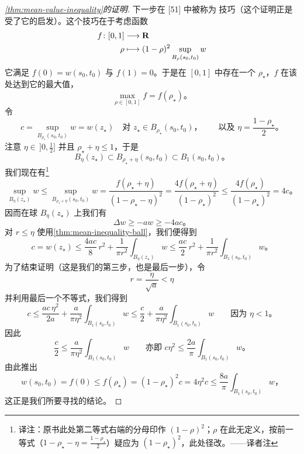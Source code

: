 \begin{proof}[\cref{thm:mean-value-inequality}的证明]
下一步在 [51] 中被称为 \emph{\trHeinz}技巧（这个证明正是受了它的启发）。这个技巧在于考虑函数
\[
\begin{aligned}
f\colon[0,1]&\longrightarrow\mathbf{R}\\
\rho&\longmapsto(1-\rho)^{2}\sup_{B_{\rho}(s_{0},t_{0})}w
\end{aligned}
\]
它满足 $f(0)=w(s_{0},t_{0})$ 与 $f(1)=0$。于是在 $[0,1]$ 中存在一个 $\rho_{\star}$，$f$ 在该处达到它的最大值，
\[
\max_{\rho\in[0,1]}f=f(\rho_{\star})\text{。}
\]
令
\[
c=\sup_{B_{\rho_{\star}}(s_{0},t_{0})}w=w(z_{\star})\quad\text{对 }z_{\star}\in B_{\rho_{\star}}(s_{0},t_{0})\text{，}\qquad\text{以及 }\eta=\frac{1-\rho_{\star}}{2}\text{。}
\]
注意 $\eta\in\,]0,\frac{1}{2}]$ 并且 $\rho_{\star}+\eta\le 1$，于是
\[
B_{\eta}(z_{\star})\subset B_{\rho_{\star}+\eta}(s_{0},t_{0})\subset B_{1}(s_{0},t_{0})\text{。}
\]
我们现在有\footnote{译注：原书此处第二等式右端的分母印作 $(1-\rho)^{2}$；$\rho$ 在此无定义，按前一等式（$1-\rho_{\star}-\eta=\frac{1-\rho_{\star}}{2}$）疑应为 $(1-\rho_{\star})^{2}$，此处径改。——译者注}
\[
\sup_{B_{\eta}(z_{\star})}w\le\sup_{B_{\rho_{\star}+\eta}(s_{0},t_{0})}w=\frac{f(\rho_{\star}+\eta)}{(1-\rho_{\star}-\eta)^{2}}=\frac{4f(\rho_{\star}+\eta)}{(1-\rho_{\star})^{2}}\le\frac{4f(\rho_{\star})}{(1-\rho_{\star})^{2}}=4c\text{。}
\]
因而在球 $B_{\eta}(z_{\star})$ 上我们有
\[
\Delta w\ge-aw\ge-4ac\text{。}
\]
对 $r\le\eta$ 使用\cref{thm:mean-inequality-ball}，我们便得到
\[
c=w(z_{\star})\le\frac{4ac}{8}\,r^{2}+\frac{1}{\pi r^{2}}\int_{B_{\eta}(z_{\star})}w\le\frac{ac}{2}\,r^{2}+\frac{1}{\pi r^{2}}\int_{B_{1}(s_{0},t_{0})}w\text{。}
\]
为了结束证明（这是我们的第三步，也是最后一步），令
\[
r=\frac{\eta}{\sqrt{a}}<\eta
\]
并利用最后一个不等式，我们得到
\[
c\le\frac{ac\,\eta^{2}}{2a}+\frac{a}{\pi\eta^{2}}\int_{B_{1}(s_{0},t_{0})}w\le\frac{c}{2}+\frac{a}{\pi\eta^{2}}\int_{B_{1}(s_{0},t_{0})}w\qquad\text{因为 }\eta<1\text{。}
\]
因此
\[
\frac{c}{2}\le\frac{a}{\pi\eta^{2}}\int_{B_{1}(s_{0},t_{0})}w\qquad\text{亦即 }c\eta^{2}\le\frac{2a}{\pi}\int_{B_{1}(s_{0},t_{0})}w\text{。}
\]
由此推出
\[
w(s_{0},t_{0})=f(0)\le f(\rho_{\star})=(1-\rho_{\star})^{2}c=4\eta^{2}c\le\frac{8a}{\pi}\int_{B_{1}(s_{0},t_{0})}w\text{，}
\]
这正是我们所要寻找的结论。
\end{proof}
